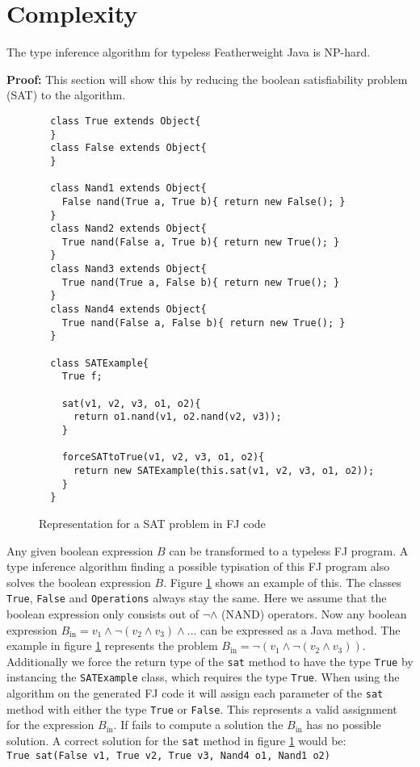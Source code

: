 \section{Complexity}
\label{sec:complexity}

\begin{theorem}[NP-Hardness]
  \label{theo:np-hardness}
  The type inference algorithm for typeless Featherweight Java is NP-hard.
\end{theorem}

\textbf{Proof:} This section will show this by reducing the boolean satisfiability problem (SAT) to the \fjtypeinference{} algorithm.

\begin{figure}
\begin{lstlisting}
  class True extends Object{
  }
  class False extends Object{
  }

  class Nand1 extends Object{
    False nand(True a, True b){ return new False(); }
  }
  class Nand2 extends Object{
    True nand(False a, True b){ return new True(); }
  }
  class Nand3 extends Object{
    True nand(True a, False b){ return new True(); }
  }
  class Nand4 extends Object{
    True nand(False a, False b){ return new True(); }
  }

  class SATExample{
    True f;

    sat(v1, v2, v3, o1, o2){
      return o1.nand(v1, o2.nand(v2, v3));
    }

    forceSATtoTrue(v1, v2, v3, o1, o2){
      return new SATExample(this.sat(v1, v2, v3, o1, o2));
    }
  }
\end{lstlisting}

\caption{Representation for a SAT problem in FJ code}
\label{fig:fjSATcode}
\end{figure}

Any given boolean expression $B$ can be transformed to a typeless FJ program.
A type inference algorithm finding a possible typisation of this FJ program also solves the boolean expression $B$.
Figure \ref{fig:fjSATcode} shows an example of this.
The classes \texttt{True}, \texttt{False} and \texttt{Operations} always stay the same.
Here we assume that the boolean expression only consists out of $\neg \land$ (NAND) operators.
Now any boolean expression $B_\text{in} = v_1 \land \neg (v_2 \land v_3) \land \ldots$ can be expressed as a Java method.
The example in figure \ref{fig:fjSATcode} represents the problem $B_\text{in} = \neg(v_1 \land \neg (v_2 \land v_3))$.
Additionally we force the return type of the \texttt{sat} method to have the type \texttt{True}
by instancing the \texttt{SATExample} class, which requires the type \texttt{True}.
When using the \fjtypeinference{} algorithm on the generated FJ code it will
assign each parameter of the \texttt{sat} method with either the type \texttt{True} or \texttt{False}.
This represents a valid assignment for the expression $B_\text{in}$.
If \fjtypeinference{} fails to compute a solution the $B_\text{in}$ has no possible solution.
A correct solution for the \texttt{sat} method in figure \ref{fig:fjSATcode} would be:\\
\texttt{True sat(False v1, True v2, True v3, Nand4 o1, Nand1 o2)}

